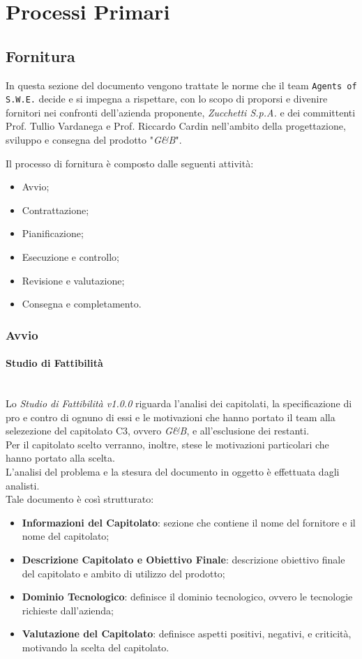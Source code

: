 \section{Processi Primari}\label{ProcessiPrimari}

\subsection{Fornitura}\label{Fornitura}
In questa sezione del documento vengono trattate le norme che il team \texttt{Agents of S.W.E.} decide e si impegna a rispettare, con lo scopo di proporsi e divenire fornitori nei confronti dell'azienda proponente, \textit{Zucchetti S.p.A.} e dei committenti Prof. Tullio Vardanega e Prof. Riccardo Cardin nell'ambito della progettazione, sviluppo e consegna del prodotto "\textit{G\&B}".

Il processo di fornitura è composto dalle seguenti attività:
\begin{itemize}
	\item Avvio;
	\item Contrattazione;
	\item Pianificazione;
	\item Esecuzione e controllo;
	\item Revisione e valutazione;
	\item Consegna e completamento.
\end{itemize}

\subsubsection{Avvio} 
\paragraph{Studio di Fattibilità} \-\\
\label{ProcessiPrimari_Sviluppo_StudioFattibilità}
Lo \textit{Studio di Fattibilità v1.0.0} riguarda l'analisi dei capitolati, la specificazione di pro e contro di ognuno di essi e le motivazioni che hanno portato il team alla selezezione del capitolato C3, ovvero \textit{G\&B}, e all'esclusione dei restanti.\\
Per il capitolato scelto verranno, inoltre, stese le motivazioni particolari che hanno portato alla scelta.\\
L'analisi del problema e la stesura del documento in oggetto è effettuata dagli analisti.\\
Tale documento è così strutturato:
\begin{itemize}
	\item \textbf{Informazioni del Capitolato}: sezione che contiene il nome del fornitore e il nome del capitolato;
	\item \textbf{Descrizione Capitolato e Obiettivo Finale}: descrizione obiettivo finale del capitolato e ambito di utilizzo del prodotto;
	\item \textbf{Dominio Tecnologico}: definisce il dominio tecnologico, ovvero le tecnologie richieste dall'azienda;
	\item \textbf{Valutazione del Capitolato}: definisce aspetti positivi, negativi, e criticità, motivando la scelta del capitolato.
\end{itemize}

